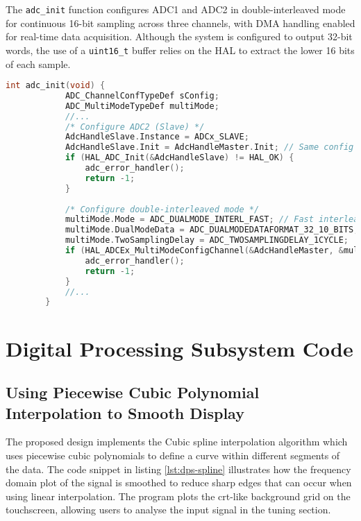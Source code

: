 \documentclass[class=report,11pt,crop=false]{standalone}
\begin{document}
	The \texttt{adc\_init} function configures ADC1 and ADC2 in double-interleaved mode for continuous 16-bit sampling across three channels, with DMA handling enabled for real-time data acquisition. Although the system is configured to output 32-bit words, the use of a \texttt{uint16\_t} buffer relies on the HAL to extract the lower 16 bits of each sample.
		
	\begin{lstlisting}[language=C, label={lst:das-spectrogram-init-code}, caption={Code snippet of the \texttt{adc\_init} function which configures the double-interleaved operation of the \acrshort{adc}s.}]
		int adc_init(void) {
			ADC_ChannelConfTypeDef sConfig;
			ADC_MultiModeTypeDef multiMode;
			//...
			/* Configure ADC2 (Slave) */
			AdcHandleSlave.Instance = ADCx_SLAVE;
			AdcHandleSlave.Init = AdcHandleMaster.Init; // Same config as master
			if (HAL_ADC_Init(&AdcHandleSlave) != HAL_OK) {
				adc_error_handler();
				return -1;
			}
			
			/* Configure double-interleaved mode */
			multiMode.Mode = ADC_DUALMODE_INTERL_FAST; // Fast interleaved mode
			multiMode.DualModeData = ADC_DUALMODEDATAFORMAT_32_10_BITS;
			multiMode.TwoSamplingDelay = ADC_TWOSAMPLINGDELAY_1CYCLE;
			if (HAL_ADCEx_MultiModeConfigChannel(&AdcHandleMaster, &multiMode) != HAL_OK) {
				adc_error_handler();
				return -1;
			}
			//...
		}
	\end{lstlisting}

	\section{Digital Processing Subsystem Code}
	
	\subsection{Using Piecewise Cubic Polynomial Interpolation to Smooth Display}
	
	The proposed design implements the Cubic spline interpolation algorithm which uses piecewise cubic polynomials to define a curve within different segments of the data. The code snippet in listing \ref{lst:dps-spline} illustrates how the frequency domain plot of the signal is smoothed to reduce sharp edges that can occur when using linear interpolation. The program plots the \acrshort{crt}-like background grid on the touchscreen, allowing users to analyse the input signal in the tuning section.
	
\end{document}
